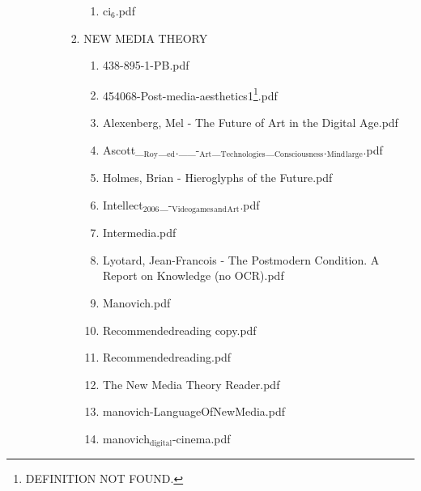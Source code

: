 \documentclass[11pt]{article}
\begin{document}
\begin{enumerate}
\begin{enumerate}
\begin{enumerate}
\begin{enumerate}
\begin{enumerate}
\item ci$_{\text{6}}$.pdf
\label{sec-1-1-1-1-7-3-37-17}
\end{enumerate}

\item NEW MEDIA THEORY
\label{sec-1-1-1-1-7-3-38}
\begin{enumerate}
\item 438-895-1-PB.pdf
\label{sec-1-1-1-1-7-3-38-1}

\item 454068-Post-media-aesthetics1\footnote{DEFINITION NOT FOUND.}.pdf
\label{sec-1-1-1-1-7-3-38-2}

\item Alexenberg, Mel - The Future of Art in the Digital Age.pdf
\label{sec-1-1-1-1-7-3-38-3}

\item Ascott\_$_{\text{Roy}}$\_$_{\text{ed}}$.\_\_-$_{\text{Art}}$\_$_{\text{Technologies}}$\_$_{\text{Consciousness}}$.$_{\text{Mind}}$$_{\text{large}}$.pdf
\label{sec-1-1-1-1-7-3-38-4}

\item Holmes, Brian - Hieroglyphs of the Future.pdf
\label{sec-1-1-1-1-7-3-38-5}

\item Intellect$_{\text{2006}}$\_-$_{\text{Videogames}}$$_{\text{and}}$$_{\text{Art}}$.pdf
\label{sec-1-1-1-1-7-3-38-6}

\item Intermedia.pdf
\label{sec-1-1-1-1-7-3-38-7}

\item Lyotard, Jean-Francois - The Postmodern Condition. A Report on Knowledge (no OCR).pdf
\label{sec-1-1-1-1-7-3-38-8}

\item Manovich.pdf
\label{sec-1-1-1-1-7-3-38-9}

\item Recommendedreading copy.pdf
\label{sec-1-1-1-1-7-3-38-10}

\item Recommendedreading.pdf
\label{sec-1-1-1-1-7-3-38-11}

\item The New Media Theory Reader.pdf
\label{sec-1-1-1-1-7-3-38-12}

\item manovich-LanguageOfNewMedia.pdf
\label{sec-1-1-1-1-7-3-38-13}

\item manovich$_{\text{digital}}$-cinema.pdf
\label{sec-1-1-1-1-7-3-38-14}


\end{enumerate}
\end{enumerate}
\end{enumerate}
\end{enumerate}
\end{enumerate}
\end{document}
